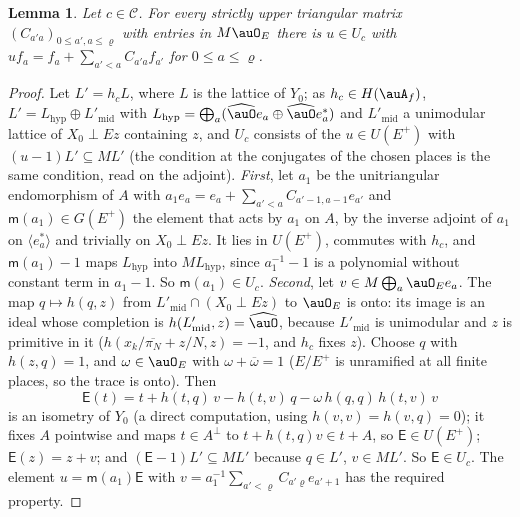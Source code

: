 \documentclass[10pt]{amsart}
\newtheorem{lemma}[theorem]{Lemma}
\theoremstyle{definition}
\theoremstyle{remark}
\providecommand{\aubar}[1]{\overline{#1}}
\begin{document}
\begin{lemma}\label{pbe:eichler}
Let $c\in\mathcal C$. For every strictly upper triangular matrix $(C_{a'a})_{0\le a',a\le\varrho}$
with entries in $M\auO_E$ there is $u\in U_c$ with $uf_a=f_a+\sum_{a'<a}C_{a'a}f_{a'}$ for $0\le a\le
\varrho$.
\end{lemma}
\begin{proof}
Let $L'=h_cL$, where $L$ is the lattice of $Y_0$; as $h_c\in H(\auA_f)$, $L'=L_{\mathrm{hyp}}\oplus
L'_{\mathrm{mid}}$ with $L_{\mathrm{hyp}}=\bigoplus_a(\widehat{\auO}e_a\oplus\widehat{\auO}e_a^*)$ and
$L'_{\mathrm{mid}}$ a unimodular lattice of $X_0\perp Ez$ containing $z$, and $U_c$ consists of the
$u\in U(E^+)$ with $(u-1)L'\subseteq ML'$ (the condition at the conjugates of the chosen places is
the same condition, read on the adjoint).
\emph{First}, let $a_1$ be the unitriangular endomorphism of $A$ with $a_1e_{a}=e_a+\sum_{a'<a}C_{a'-1,
a-1}e_{a'}$ and $\mathsf m(a_1)\in G(E^+)$ the element that acts by $a_1$ on $A$, by the inverse
adjoint of $a_1$ on $\langle e_a^*\rangle$ and trivially on $X_0\perp Ez$. It lies in $U(E^+)$,
commutes with $h_c$, and $\mathsf m(a_1)-1$ maps $L_{\mathrm{hyp}}$ into $ML_{\mathrm{hyp}}$, since
$a_1^{-1}-1$ is a polynomial without constant term in $a_1-1$. So $\mathsf m(a_1)\in U_c$.
\emph{Second}, let $v\in M\bigoplus_a\auO_Ee_a$. The map $q\mapsto h(q,z)$ from $L'_{\mathrm{mid}}\cap
(X_0\perp Ez)$ to $\auO_E$ is onto: its image is an ideal whose completion is $h(L'_{\mathrm{mid}},z)
=\widehat{\auO}$, because $L'_{\mathrm{mid}}$ is unimodular and $z$ is primitive in it ($h(x_k/\aubar{
\pi_N}+z/N,z)=-1$, and $h_c$ fixes $z$). Choose $q$ with $h(z,q)=1$, and $\omega\in\auO_E$ with
$\omega+\aubar\omega=1$ ($E/E^+$ is unramified at all finite places, so the trace is onto). Then
\[
\mathsf E(t)=t+h(t,q)\,v-h(t,v)\,q-\omega\,h(q,q)\,h(t,v)\,v
\]
is an isometry of $Y_0$ (a direct computation, using $h(v,v)=h(v,q)=0$); it fixes $A$ pointwise and
maps $t\in A^\perp$ to $t+h(t,q)v\in t+A$, so $\mathsf E\in U(E^+)$; $\mathsf E(z)=z+v$; and $(\mathsf
E-1)L'\subseteq ML'$ because $q\in L'$, $v\in ML'$. So $\mathsf E\in U_c$. The element $u=\mathsf
m(a_1)\mathsf E$ with $v=a_1^{-1}\sum_{a'<\varrho}C_{a'\varrho}e_{a'+1}$ has the required property.
\end{proof}
\end{document}
